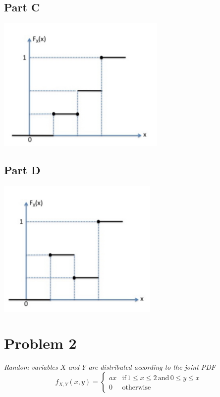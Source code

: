 \documentclass{article}
\begin{document}
\subsection*{Part C}

\begin{center}
    \includegraphics[scale=1]{Images/P1C.PNG}
\end{center}

\subsection*{Part D}

\begin{center}
    \includegraphics[scale=1]{Images/P1D.PNG}
\end{center}

\section*{Problem 2}

\textit{Random variables $ X $ and $ Y $ are distributed according to the
joint PDF}
$$ f_{X,Y}(x, y) = \begin{cases}
    ax & \mathrm{if} \, 1 \leq x \leq 2 \, \mathrm{and} \, 0 \leq y \leq x \\
    0 & \mathrm{otherwise}
\end{cases} $$
\end{document}
